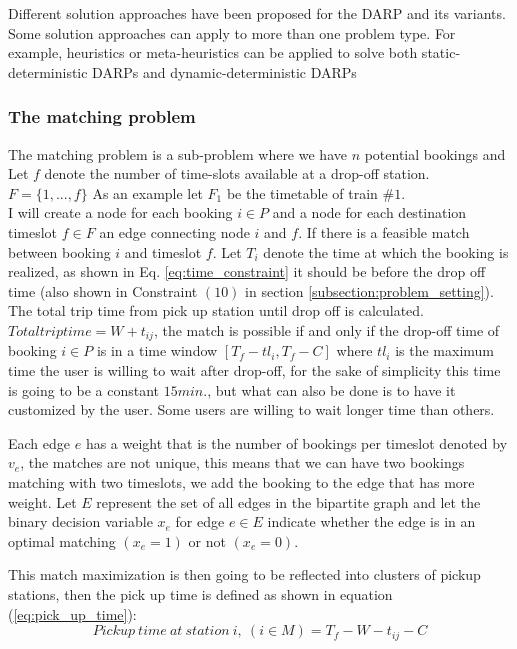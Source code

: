 \documentclass{article}
\begin{document}
Different solution approaches have been proposed for the DARP and its variants. Some solution approaches can apply to more than one problem type. 
For example, heuristics or meta-heuristics can be applied to solve both static-deterministic DARPs and dynamic-deterministic DARPs

\subsubsection{The matching problem}

The matching problem is a sub-problem where we have $n$ potential bookings and 
Let $f$ denote the number of time-slots available at a drop-off station. $F = \{ 1, ..., f \}$ As an example let $F_1$ be the timetable of train $\#1$.\\
I will create a node for each booking $i \in P$ and a node for each destination timeslot $f \in F$ an edge connecting node $i$ and $f$. If there is a feasible match between booking $i$ and timeslot $f$. 
Let $T_i$ denote the time at which the booking is realized, as shown in Eq. \ref{eq:time_constraint} it should be before the drop off time (also shown in Constraint $(10)$ in section \ref{subsection:problem_setting}).
The total trip time from pick up station until drop off is calculated. $Total trip time = W + t_{ij} $, the match is possible if and only if the drop-off time of booking $i \in P$ is in a time window $[T_f - tl_i,T_f - C ]$ where
$tl_i$ is the maximum time the user is willing to wait after drop-off, for the sake of simplicity this time is going to be a constant $15min.$, but what can also be done is to have it customized by the user. Some users are willing to
wait longer time than others.

Each edge $e$ has a weight that is the number of bookings per timeslot denoted by $v_e$, the matches are not unique, this means that we can have two bookings matching with two timeslots, we add the booking to the edge that has more weight.
Let $E$ represent the set of all edges in the bipartite graph and let the binary decision variable $x_e$ for edge $e \in E$ indicate whether the edge is in an optimal matching $(x_e = 1)$ or not $(x_e = 0)$.

This match maximization is then going to be reflected into clusters of pickup stations, then the pick up time is defined as shown in equation (\ref{eq:pick_up_time}):
\begin{equation}
\label{eq:pick_up_time}
Pickup \ time \ at \ station\ i, \ (i \in M) = T_f - W - t_{ij} - C
\end{equation}
\end{document}
